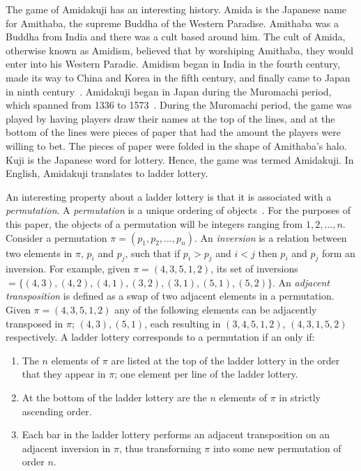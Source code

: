 The game of Amidakuji has an interesting history. Amida is the Japanese name 
for Amithaba, the supreme Buddha of the Western Paradise. Amithaba
was a Buddha from India and there was a cult based around him. The cult 
of Amida, otherwise known as Amidism, believed that by worshiping Amithaba, they would 
enter into his Western Paradie. Amidism began in India in the fourth century,
made its way to China and Korea in the fifth century, and finally came 
to Japan in ninth century~\cite{A0}. Amidakuji began in Japan during 
the Muromachi period, which spanned from
1336 to 1573~\cite{A0}. During the Muromachi period, the game was played by having
players draw their names at the top of the lines, and at the bottom 
of the lines were pieces of paper that had the amount the players
were willing to bet. The pieces of paper were folded in the shape of 
Amithaba's halo. Kuji is the Japanese word for lottery. Hence, the game 
was termed Amidakuji. In English, Amidakuji translates to ladder lottery. 


An interesting property about a ladder lottery is that it is  
associated with a \emph{permutation}. A \emph{permutation} is a unique ordering of objects~\cite{A1}. 
For the purposes of this paper, the objects of a permutation will be integers 
ranging from $1,2, \dots ,n$. Consider a permutation $\pi=(p_{1},p_{2}, \dots ,p_{n})$.
An \emph{inversion} is a relation between two elements in $\pi$, 
$p_{i}$ and $p_{j}$, such that if $p_{i}>p_{j}$ and $i<j$ then $p_{i}$ and $p_{j}$ 
form an inversion. 
For example, given $\pi=(4,3,5,1,2)$, its set of inversions $=\{(4,3),(4,2),(4,1),(3,2),(3,1),(5,1),(5,2)\}$.
An \emph{adjacent transposition} is defined as a swap of two adjacent elements in a permutation.
Given $\pi=(4,3,5,1,2)$ any of the 
following elements can be adjacently transposed in $\pi$; $(4,3),(5,1)$, each resulting in $(3,4,5,1,2)$, $(4,3,1,5,2)$ respectively. 
A ladder lottery corresponds to a permutation if an only if:
\begin{enumerate}
	\item The $n$ elements of $\pi$ are listed at the top of the ladder lottery in the order that they appear in 
	$\pi$; one element per line of the ladder lottery.
	\item At the bottom of the ladder lottery are the $n$ elements of $\pi$ in strictly ascending order. 
	\item Each bar in the ladder lottery performs an adjacent transposition on an adjacent inversion in $\pi$, 
	thus transforming $\pi$ into some new permutation of order $n$. 
\end{enumerate} 

